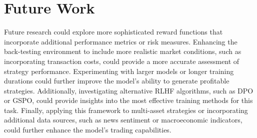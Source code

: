 \documentclass[12pt, a4paper]{report}
\begin{document}
\section{Future Work}

Future research could explore more sophisticated reward functions that incorporate additional performance metrics or risk measures.
Enhancing the back-testing environment to include more realistic market conditions, such as incorporating transaction costs, could provide a more accurate assessment of strategy performance. 
Experimenting with larger models or longer training durations could further improve the model's ability to generate profitable strategies.
Additionally, investigating alternative RLHF algorithms, such as DPO or GSPO, could provide insights into the most effective training methods for this task. 
Finally, applying this framework to multi-asset strategies or incorporating additional data sources, such as news sentiment or macroeconomic indicators, could further enhance the model's trading capabilities.


\end{document}
